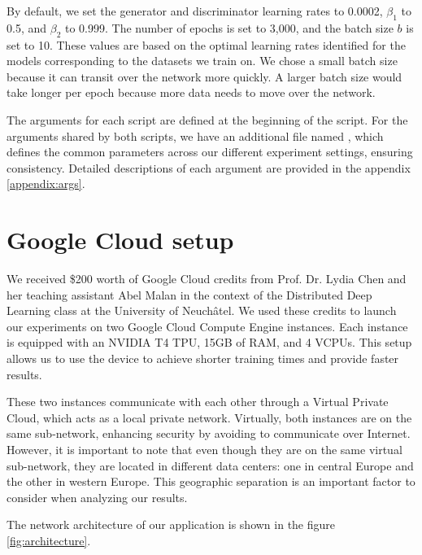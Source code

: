 By default, we set the generator and discriminator learning rates to 0.0002, $\beta_1$ to 0.5, and $\beta_2$ to 0.999. The number of epochs is set to 3,000, and the batch size $b$ is set to 10. These values are based on the optimal learning rates identified for the models corresponding to the datasets we train on. We chose a small batch size because it can transit over the network more quickly. A larger batch size would take longer per epoch because more data needs to move over the network.

The arguments for each script are defined at the beginning of the script. For the arguments shared by both scripts, we have an additional file named , which defines the common parameters across our different experiment settings, ensuring consistency. Detailed descriptions of each argument are provided in the appendix \ref{appendix:args}.

\section{Google Cloud setup}
We received \$200 worth of Google Cloud credits from Prof. Dr. Lydia Chen and her teaching assistant Abel Malan in the context of the Distributed Deep Learning class at the University of Neuchâtel. We used these credits to launch our experiments on two Google Cloud Compute Engine instances. Each instance is equipped with an NVIDIA T4 TPU, 15GB of RAM, and 4 VCPUs. This setup allows us to use the  device to achieve shorter training times and provide faster results.

These two instances communicate with each other through a Virtual Private Cloud, which acts as a local private network. Virtually, both instances are on the same sub-network, enhancing security by avoiding to communicate over Internet. However, it is important to note that even though they are on the same virtual sub-network, they are located in different data centers: one in central Europe and the other in western Europe. This geographic separation is an important factor to consider when analyzing our results.

The network architecture of our application is shown in the figure \ref{fig:architecture}. 



